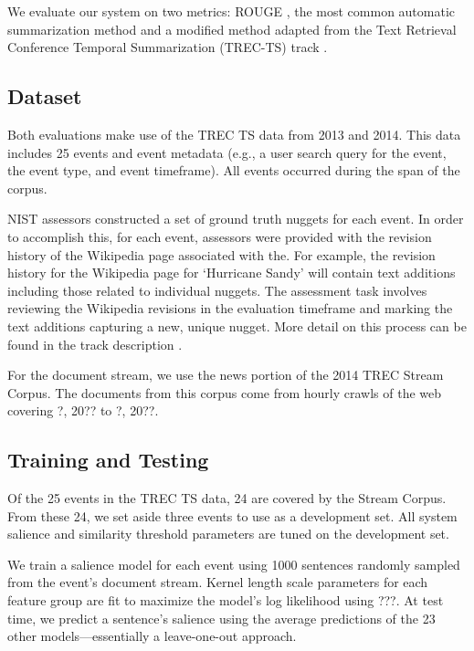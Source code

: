 We evaluate our system on two metrics: ROUGE \cite{?}, the most common automatic
summarization method and a modified method adapted 
from the Text Retrieval Conference Temporal Summarization (TREC-TS) track \cite{?}.

\subsection{Dataset}

Both evaluations make use of the TREC TS data from 2013 and 2014. 
This data includes 25 events and event metadata (e.g., a user
search query for the event, the event type, and event timeframe).  All events
occurred during the span of the corpus.

NIST assessors constructed a set of ground truth nuggets for each event. In order
to accomplish this, for each event, assessors were provided with the
revision history of the Wikipedia page associated with the.  For example, 
the revision history for the Wikipedia page for `Hurricane Sandy' will 
contain text additions including those related to individual nuggets.  The assessment
task involves reviewing the Wikipedia revisions in the evaluation timeframe 
and marking the text additions capturing a new, unique nugget.  More detail
on this process can be found in the track description \cite{?}.

For the document stream, we use the news portion of the
 2014 TREC Stream Corpus.
The documents from this corpus come from hourly crawls of the web covering 
 ?, 20?? to ?, 20??. 

\subsection{Training and Testing}

Of the 25 events in the TREC TS data, 24 are covered by the Stream Corpus.
From these 24, we set aside three events to use as a development set.
All system salience and similarity threshold parameters are tuned on the
development set.

We train a salience model for each event using 1000 sentences randomly sampled
from the event's document stream. Kernel length scale parameters  for each
feature group are fit to maximize
the model's log likelihood using ???.
At test time, we predict a sentence's salience using the average predictions
of the 23 other models---essentially a leave-one-out approach.   

